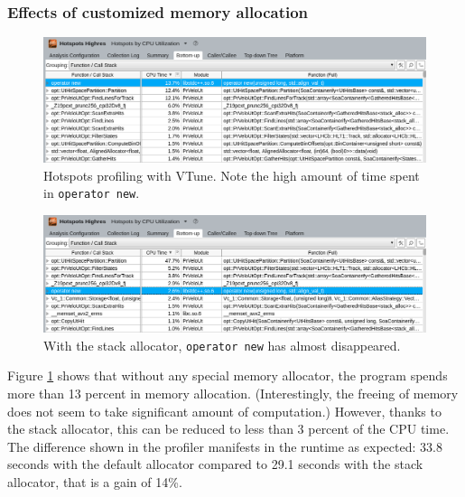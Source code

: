 \documentclass[12pt]{article}
\newcommand{\code}[1]{\texttt{#1}}
\begin{document}
\subsubsection{Effects of customized memory allocation}


\begin{figure}[H]
	\begin{center}
		\includegraphics[width=\textwidth]{velout_without_alloc}
	\end{center}
	\caption{Hotspots profiling with VTune. Note the high amount of time spent in \code{operator new}.}
	\label{fig_velout_without_alloc}
\end{figure}


\begin{figure}[H]
	\begin{center}
		\includegraphics[width=\textwidth]{velout_with_alloc}
	\end{center}
	\caption{With the stack allocator, \code{operator new} has almost disappeared.}
	\label{fig_velout_with_alloc}
\end{figure}

Figure \ref{fig_velout_without_alloc} shows that without any special memory allocator, the program spends more than 13 percent in memory allocation. (Interestingly, the freeing of memory does not seem to take significant amount of computation.) However, thanks to the stack allocator, this can be reduced to less than 3 percent of the CPU time. The difference shown in the profiler manifests in the runtime as expected: 33.8 seconds with the default allocator compared to 29.1 seconds with the stack allocator, that is a gain of 14\%.
\end{document}
